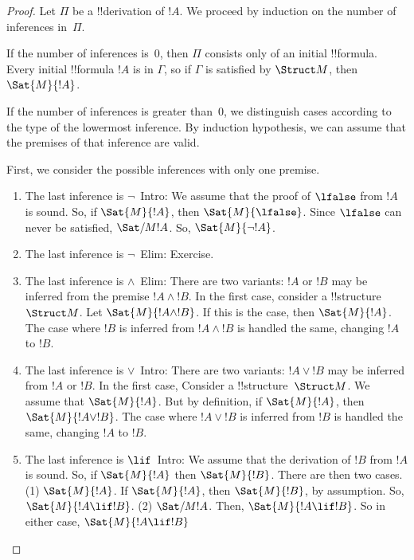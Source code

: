\documentclass[../../include/open-logic-section]{subfiles}
\begin{document}
\begin{proof}
Let $\Pi$ be a !!{derivation} of $!A$. We proceed by
induction on the number of inferences in~$\Pi$.

If the number of inferences is~0, then $\Pi$ consists only of an
initial !!{formula}. Every initial !!{formula} $!A$ is in $\Gamma$,
so if $\Gamma$ is satisfied by $\Struct M$, then $\Sat{M}{!A}$.

If the number of inferences is greater than~0, we distinguish cases
according to the type of the lowermost inference. By induction
hypothesis, we can assume that the premises of that inference are
valid.

First, we consider the possible inferences with only one premise.

\begin{enumerate}
\item The last inference is $\lnot$~Intro: We assume that the proof
of $\lfalse$ from $!A$ is sound. So, if $\Sat{M}{!A}$, then $\Sat{M}
{\lfalse}$. Since $\lfalse$ can never be satisfied, $\Sat/{M}{!A}$.
So, $\Sat{M}{\lnot !A}$.
  
\item The last inference is $\lnot$~Elim: Exercise.

\item The last inference is $\land$~Elim: There are two variants: $!A$ or $!B$
  may be inferred from the premise $!A \land !B$.  In the first case,
  consider a !!{structure}~$\Struct M$. Let $\Sat{M}{!A \land !B}$. If this
  is the case, then $\Sat{M}{!A}$. The case where $!B$ is inferred from $!A 
  \land !B$ is handled the same, changing $!A$ to $!B$.
  
\item The last inference is $\lor$~Intro: There are two variants: $!A
  \lor !B$ may be inferred from $!A$ or $!B$. In the first case,
  Consider a !!{structure}~$\Struct M$. We assume that $\Sat{M}
  {!A}$. But by definition, if $\Sat{M}{!A}$, then $\Sat{M}{!A \lor !B}$.
  The case where $!A \lor !B$ is inferred from $!B$ is
  handled the same, changing $!A$ to $!B$.
  
\item The last inference is $\lif$~Intro: We assume that the derivation
  of $!B$ from $!A$ is sound. So, if $\Sat{M}{!A}$ then $\Sat{M}{!B}$.
  There are then two cases. (1) $\Sat{M}{!A}$. If $\Sat{M}{!A}$, then 
  $\Sat{M}{!B}$, by assumption. So, $\Sat{M}{!A \lif !B}$. (2) $\Sat/{M}
  {!A}$. Then, $\Sat{M}{!A \lif !B}$. So in either case, $\Sat{M}{!A \lif !B}$
  

\end{enumerate}
\end{proof}
\end{document}
